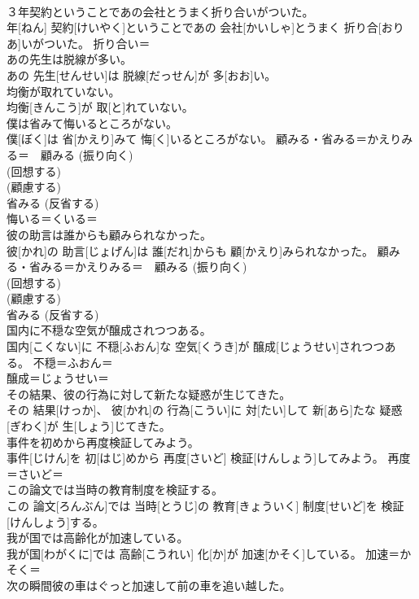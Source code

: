 \documentclass[8pt]{extreport}
\begin{document}
\begin{CJK}{UTF8}{min}
\\	３年契約ということであの会社とうまく折り合いがついた。	
\\	年[ねん] 契約[けいやく]ということであの 会社[かいしゃ]とうまく 折り合[おりあ]いがついた。	折り合い＝ 
\\	あの先生は脱線が多い。	
\\	あの 先生[せんせい]は 脱線[だっせん]が 多[おお]い。	
\\	均衡が取れていない。	
\\	均衡[きんこう]が 取[と]れていない。	
\\	僕は省みて悔いるところがない。	
\\	僕[ぼく]は 省[かえり]みて 悔[く]いるところがない。	顧みる・省みる＝かえりみる＝　{顧みる} (振り向く) 
\\	(回想する) 
\\	(顧慮する) 
\\	{省みる} (反省する) 
\\	悔いる＝くいる＝ 
\\	彼の助言は誰からも顧みられなかった。	
\\	彼[かれ]の 助言[じょげん]は 誰[だれ]からも 顧[かえり]みられなかった。	顧みる・省みる＝かえりみる＝　{顧みる} (振り向く) 
\\	(回想する) 
\\	(顧慮する) 
\\	{省みる} (反省する) 
\\	国内に不穏な空気が醸成されつつある。	
\\	国内[こくない]に 不穏[ふおん]な 空気[くうき]が 醸成[じょうせい]されつつある。	不穏＝ふおん＝ 
\\	醸成＝じょうせい＝ 
\\	その結果、彼の行為に対して新たな疑惑が生じてきた。	
\\	その 結果[けっか]、 彼[かれ]の 行為[こうい]に 対[たい]して 新[あら]たな 疑惑[ぎわく]が 生[しょう]じてきた。	
\\	事件を初めから再度検証してみよう。	
\\	事件[じけん]を 初[はじ]めから 再度[さいど] 検証[けんしょう]してみよう。	再度＝さいど＝ 
\\	この論文では当時の教育制度を検証する。	
\\	この 論文[ろんぶん]では 当時[とうじ]の 教育[きょういく] 制度[せいど]を 検証[けんしょう]する。	
\\	我が国では高齢化が加速している。	
\\	我が国[わがくに]では 高齢[こうれい] 化[か]が 加速[かそく]している。	加速＝かそく＝ 
\\	次の瞬間彼の車はぐっと加速して前の車を追い越した。	

\end{CJK}
\end{document}
